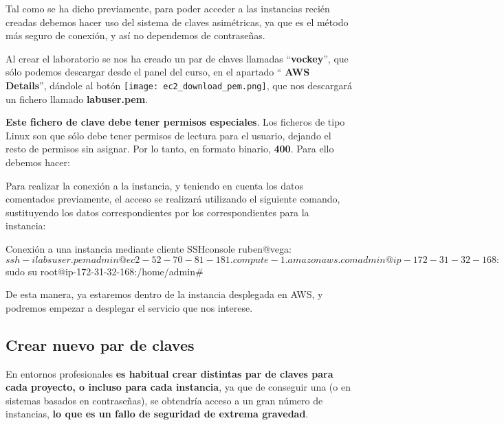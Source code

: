Tal como se ha dicho previamente, para poder acceder a las instancias recién creadas debemos hacer uso del sistema de claves asimétricas, ya que es el método más seguro de conexión, y así no dependemos de contraseñas.

Al crear el laboratorio se nos ha creado un par de claves llamadas “\textbf{vockey}”, que sólo podemos descargar desde el panel del curso, en el apartado “\faInfo  \textbf{ AWS Details}”, dándole al botón \texttt{[image: ec2\_download\_pem.png]}, que nos descargará un fichero llamado \textbf{labuser.pem}.

\textbf{Este fichero de clave debe tener permisos especiales}. Los ficheros de tipo Linux son que sólo debe tener permisos de lectura para el usuario, dejando el resto de permisos sin asignar. Por lo tanto, en formato binario, \textbf{400}. Para ello debemos hacer:


Para realizar la conexión a la instancia, y teniendo en cuenta los datos comentados previamente, el acceso se realizará utilizando el siguiente comando, sustituyendo los datos correspondientes por los correspondientes para la instancia:

\begin{mycode}{Conexión a una instancia mediante cliente SSH}{console}{{\footnotesize }}
ruben@vega:~$ ssh -i labsuser.pem admin@ec2-52-70-81-181.compute-1.amazonaws.com
admin@ip-172-31-32-168:~$ sudo su
root@ip-172-31-32-168:/home/admin#
\end{mycode}

De esta manera, ya estaremos dentro de la instancia desplegada en AWS, y podremos empezar a desplegar el servicio que nos interese.


\subsection{Crear nuevo par de claves}
En entornos profesionales \textbf{es habitual crear distintas par de claves para cada proyecto, o incluso para cada instancia}, ya que de conseguir una (o en sistemas basados en contraseñas), se obtendría acceso a un gran número de instancias, \textbf{lo que es un fallo de seguridad de extrema gravedad}.


